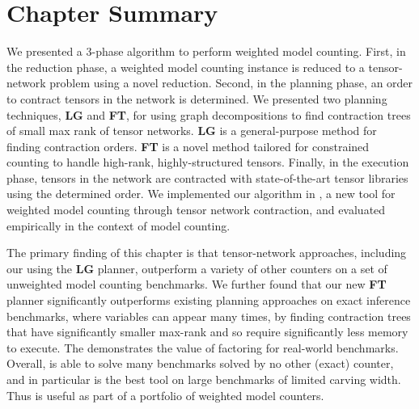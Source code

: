 \section{Chapter Summary} \label{sec:tensors:conclusion}
We presented a 3-phase algorithm to perform weighted model counting. First, in the reduction phase, a weighted model counting instance is reduced to a tensor-network problem using a novel reduction. Second, in the planning phase, an order to contract tensors in the network is determined. We presented two planning techniques, \textbf{LG} and \textbf{FT}, for using graph decompositions to find contraction trees of small max rank of tensor networks. \textbf{LG} is a general-purpose method for finding contraction orders. \textbf{FT} is a novel method tailored for constrained counting to handle high-rank, highly-structured tensors. Finally, in the execution phase, tensors in the network are contracted with state-of-the-art tensor libraries using the determined order.
We implemented our algorithm in , a new tool for weighted model counting through tensor network contraction, and evaluated  empirically in the context of model counting.

{ \color{blue}
The primary finding of this chapter is that tensor-network approaches, including our  using the \textbf{LG} planner, outperform a variety of other counters on a set of unweighted model counting benchmarks.
We further found that our new \textbf{FT} planner significantly outperforms existing planning approaches on exact inference benchmarks, where variables can appear many times, by finding contraction trees that have significantly smaller max-rank and so require significantly less memory to execute.
The demonstrates the value of factoring for real-world benchmarks.
Overall,  is able to solve many benchmarks solved by no other (exact) counter, and in particular  is the best tool on large benchmarks of limited carving width.
Thus  is useful as part of a portfolio of weighted model counters.
} %

